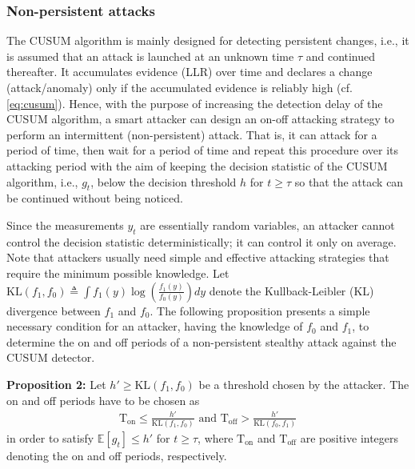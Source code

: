 \documentclass[onecolumn]{IEEEtran}
\begin{document}

\noindent \subsubsection{Non-persistent attacks}

The CUSUM algorithm is mainly designed for detecting persistent changes, i.e., it is assumed that an attack is launched at an unknown time $\tau$ and continued thereafter. It accumulates evidence (LLR) over time and declares a change (attack/anomaly) only if the accumulated evidence is reliably high (cf. \eqref{eq:cusum}). Hence, with the purpose of increasing the detection delay of the CUSUM algorithm, a smart attacker can design an on-off attacking strategy to perform an intermittent (non-persistent) attack.  That is, it can attack for a period of time, then wait for a period of time and repeat this procedure over its attacking period with the aim of keeping the decision statistic of the CUSUM algorithm, i.e., $g_t$, below the decision threshold $h$ for $t \geq \tau$ so that the attack can be continued without being noticed.

Since the measurements $y_t$ are essentially random variables, an attacker cannot control the decision statistic deterministically; it can control it only on average. Note that attackers usually need simple and effective attacking strategies that require the minimum possible knowledge. Let $\mathrm{KL}(f_1,f_0) \triangleq \int{f_1(y) \log(\frac{f_1(y)}{f_0(y)}) dy}$ denote the Kullback-Leibler (KL) divergence between $f_1$ and $f_0$. The following proposition presents a simple necessary condition for an attacker, having the knowledge of $f_0$ and $f_1$, to determine the on and off periods of a non-persistent stealthy attack against the CUSUM detector.

\textbf{Proposition 2:} Let $h' \geq \mathrm{KL}(f_1,f_0)$ be a threshold chosen by the attacker. The on and off periods have to be chosen as
\begin{gather}\nonumber
\mathrm{T}_{\text{on}} \leq \frac{h'}{\mathrm{KL}(f_1,f_0)} \mbox{ and } \mathrm{T}_{\text{off}} > \frac{h'}{\mathrm{KL}(f_0,f_1)}
\end{gather}
in order to satisfy $\mathbb{E}[g_t] \leq h'$ for $t \geq \tau$, where $\mathrm{T}_{\text{on}}$ and $\mathrm{T}_{\text{off}}$ are positive integers denoting the on and off periods, respectively.
\end{document}
